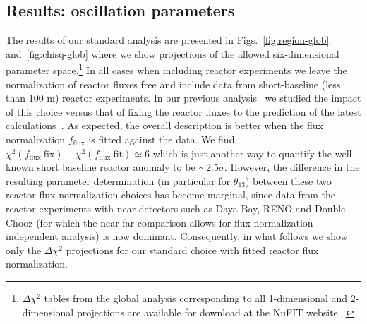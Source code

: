 \documentclass[a4paper, 11pt]{article}
\begin{document}
\subsection{Results: oscillation parameters}
\label{subsec:oscparam}

The results of our standard analysis are presented in
Figs.~\ref{fig:region-glob} and~\ref{fig:chisq-glob} where we show
projections of the allowed six-dimensional parameter
space.\footnote{$\Delta\chi^2$ tables from the global analysis
  corresponding to all 1-dimensional and 2-dimensional projections are
  available for download at the NuFIT website~\cite{nufit}.}  In all
cases when including reactor experiments we leave the normalization of
reactor fluxes free and include data from short-baseline (less than
100 m) reactor experiments. In our previous
analysis~\cite{Gonzalez-Garcia:2014bfa, GonzalezGarcia:2012sz} we
studied the impact of this choice versus that of fixing the reactor
fluxes to the prediction of the latest
calculations~\cite{Mueller:2011nm, Huber:2011wv, Mention:2011rk}.  As
expected, the overall description is better when the flux
normalization $f_\text{flux}$ is fitted against the data.  We find
$\chi^2(f_\text{flux}~\text{fix}) - \chi^2(f_\text{flux}~\text{fit})
\simeq 6$ which is just another way to quantify the well-known short
baseline reactor anomaly to be $\sim 2.5\sigma$.  However, the
difference in the resulting parameter determination (in particular for
$\theta_{13}$) between these two reactor flux normalization choices
has become marginal, since data from the reactor experiments with near
detectors such as Daya-Bay, RENO and Double-Chooz (for which the
near-far comparison allows for flux-normalization independent
analysis) is now dominant.  Consequently, in what follows we show only
the $\Delta\chi^2$ projections for our standard choice with fitted
reactor flux normalization.
\end{document}
